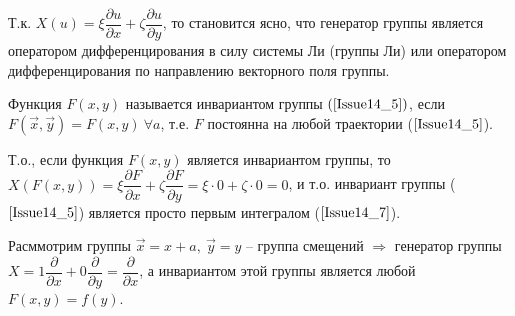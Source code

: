 Т.к. $X(u) = \xi \dfrac{\partial u}{\partial x} + \zeta \dfrac{\partial u}{\partial y}$, то становится ясно, что генератор группы является оператором дифференцирования в силу системы Ли (группы Ли) или оператором дифференцирования по направлению векторного поля группы.

\begin{definition}
Функция $F(x,y)$ называется $\textbf{инвариантом группы}$ $(\ref{Issue14_5})$, если \
$F(\vec{x}, \vec{y}) = F(x,y)\  \forall a$, т.е. $F$ постоянна на любой траектории ($\ref{Issue14_5}$).
\end{definition}


Т.о., если функция $F(x,y)$ является инвариантом группы, то $X(F(x,y)) = \xi \dfrac{\partial F}{\partial x} + \zeta \dfrac{\partial F}{\partial y} = \xi \cdot 0 + \zeta \cdot 0 = 0$, и т.о. инвариант группы ($\ref{Issue14_5}$) является просто первым интегралом ($\ref{Issue14_7}$).

Расммотрим группы $\vec{x} = x + a,\ \vec{y} = y$ -- группа смещений $\Rightarrow$ генератор группы $X = 1 \dfrac{\partial}{\partial x} + 0 \dfrac{\partial}{\partial y} = \dfrac{\partial}{\partial x}$, а инвариантом этой группы является любой $F(x,y) = f(y)$.

